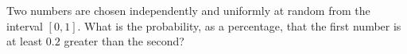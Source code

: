Two numbers are chosen independently and uniformly at random from the interval $[0,1]$. What is the probability, as a percentage, that the first number is at least $0.2$ greater than the second?
